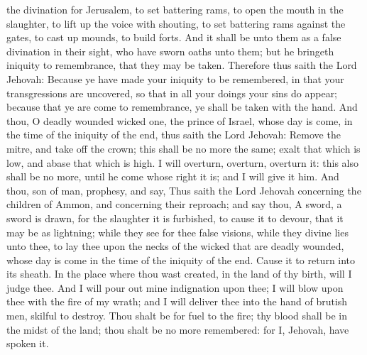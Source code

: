 the divination for Jerusalem, to set battering rams, to open the mouth in the slaughter, to lift up the voice with shouting, to set battering rams against the gates, to cast up mounds, to build forts. And it shall be unto them as a false divination in their sight, who have sworn oaths unto them; but he bringeth iniquity to remembrance, that they may be taken.  Therefore thus saith the Lord Jehovah: Because ye have made your iniquity to be remembered, in that your transgressions are uncovered, so that in all your doings your sins do appear; because that ye are come to remembrance, ye shall be taken with the hand. And thou, O deadly wounded wicked one, the prince of Israel, whose day is come, in the time of the iniquity of the end, thus saith the Lord Jehovah: Remove the mitre, and take off the crown; this shall be no more the same; exalt that which is low, and abase that which is high. I will overturn, overturn, overturn it: this also shall be no more, until he come whose right it is; and I will give it him.  And thou, son of man, prophesy, and say, Thus saith the Lord Jehovah concerning the children of Ammon, and concerning their reproach; and say thou, A sword, a sword is drawn, for the slaughter it is furbished, to cause it to devour, that it may be as lightning; while they see for thee false visions, while they divine lies unto thee, to lay thee upon the necks of the wicked that are deadly wounded, whose day is come in the time of the iniquity of the end. Cause it to return into its sheath. In the place where thou wast created, in the land of thy birth, will I judge thee. And I will pour out mine indignation upon thee; I will blow upon thee with the fire of my wrath; and I will deliver thee into the hand of brutish men, skilful to destroy. Thou shalt be for fuel to the fire; thy blood shall be in the midst of the land; thou shalt be no more remembered: for I, Jehovah, have spoken it. 

